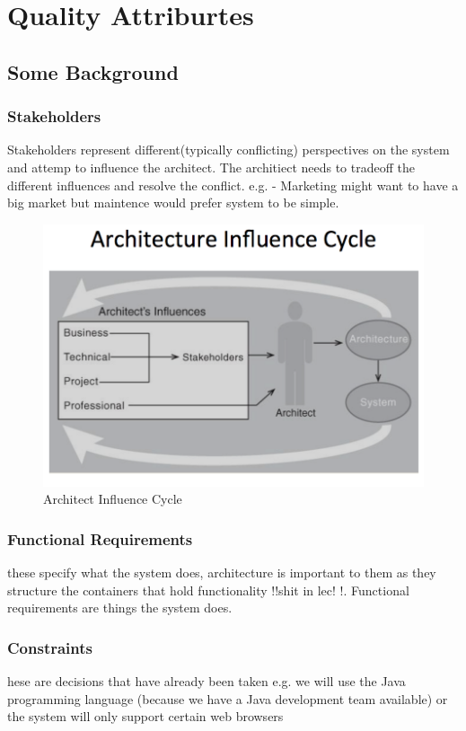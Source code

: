 \documentclass[a4paper]{report}
\begin{document}
\chapter{Quality Attriburtes}
\section{Some Background}
\subsection{Stakeholders}
Stakeholders represent different(typically conflicting) perspectives on the system and attemp to influence the architect. The architiect needs to tradeoff the different influences and resolve the conflict. e.g. -  Marketing might want to have a big market but maintence would prefer system to be simple. 

\begin{figure}[h]
\centering 
\includegraphics[scale=0.3]{aimages/influencecycle.png}
\caption{\label{tab:widgets}Architect Influence Cycle }
\end{figure}

\subsection{Functional Requirements}
these specify what the system does, architecture is important to them as they structure the containers that hold functionality !!shit in lec! !. Functional requirements are things the system does.

\subsection{Constraints}
hese are decisions that have already been taken e.g. we will use the Java programming language (because we have a Java development team available) or the system will only support certain web browsers
\end{document}
